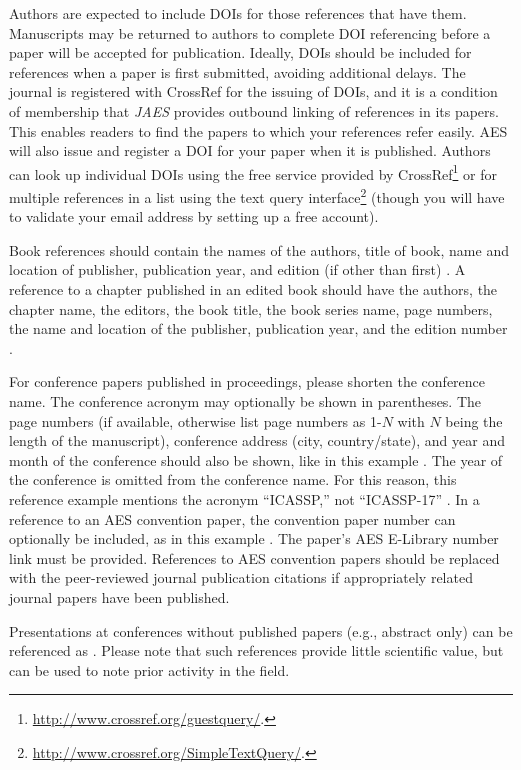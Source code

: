 \documentclass[fleqn]{jaes}
\begin{document}
Authors are expected to include DOIs for those references that have them. Manuscripts may be returned to authors to complete DOI referencing before a paper will be accepted for publication. Ideally, DOIs should be included for references when a paper is first submitted, avoiding additional delays. The journal is registered with CrossRef for the issuing of DOIs, and it is a condition of membership that \textit{JAES} provides outbound linking of references in its papers. This enables readers to find the papers to which your references refer easily. AES will also issue and register a DOI for your paper when it is published. Authors can look up individual DOIs using the free service provided by CrossRef\footnote{\url{http://www.crossref.org/guestquery/}.} or for multiple references in a list using the text query interface\footnote{\url{http://www.crossref.org/SimpleTextQuery/}.} (though you will have to validate your email address by setting up a free account).

Book references should contain the names of the authors, title of book, name and location of publisher, publication year, and edition (if other than first) \cite{a_book_ref, a_book_ref_2nd_edition}. A reference to a chapter published in an edited book should have the authors, the chapter name, the editors, the book title, the book series name, page numbers, the name and location of the publisher, publication year, and the edition number \cite{a_book_chapter}. 

For conference papers published in proceedings, please shorten the conference name. The conference acronym may optionally be shown in parentheses. The page numbers (if available, otherwise list page numbers as 1-$N$ with $N$ being the length of the manuscript), conference address (city, country/state), and year and month of the conference should also be shown, like in this example \cite{a_nonAESconference_paper}. The year of the conference is omitted from the conference name. For this reason, this reference example mentions the acronym ``ICASSP,'' not ``ICASSP-17'' \cite{a_nonAESconference_paper}. 
In a reference to an AES convention paper, the convention paper number can optionally be included, as in this example \cite{AES_convention_paper}. The paper's AES E-Library number link must be provided. References to AES convention papers should be replaced with the peer-reviewed journal publication citations if appropriately related journal papers have been published.

Presentations at conferences without published papers (e.g., abstract only) can be referenced as \cite{a_conference_presentation}. Please note that such references provide little scientific value, but can be used to note prior activity in the field. 
\end{document}
